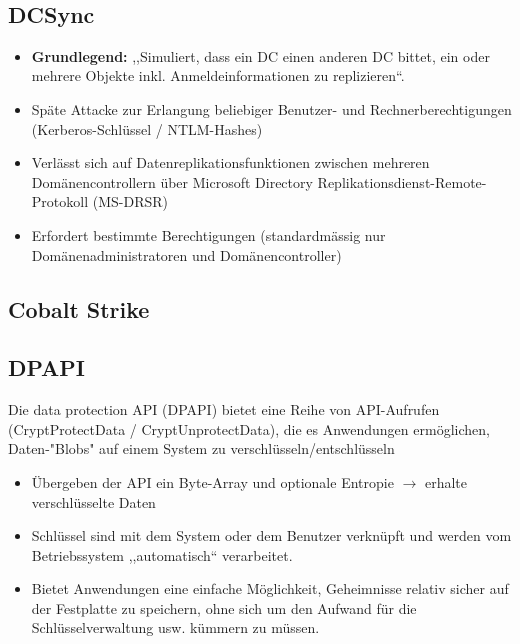 \vfill
$ $
\columnbreak

\subsection{DCSync}
\begin{itemize}
    \item \textbf{Grundlegend:} ,,Simuliert, dass ein DC einen anderen DC bittet, ein oder mehrere Objekte inkl. Anmeldeinformationen zu replizieren``.
    \item Späte Attacke zur Erlangung beliebiger Benutzer- und Rechnerberechtigungen (Kerberos-Schlüssel / NTLM-Hashes)
    \item Verlässt sich auf Datenreplikationsfunktionen zwischen mehreren Domänencontrollern über Microsoft Directory Replikationsdienst-Remote-Protokoll (MS-DRSR)
    \item Erfordert bestimmte Berechtigungen (standardmässig nur Domänenadministratoren und Domänencontroller)
\end{itemize}

\subsection{Cobalt Strike}

\subsection{DPAPI}

Die data protection API (DPAPI) bietet eine Reihe von API-Aufrufen (CryptProtectData / CryptUnprotectData), die es Anwendungen ermöglichen, Daten-"Blobs" auf einem System zu verschlüsseln/entschlüsseln
\begin{itemize}
    \item Übergeben der API ein Byte-Array und optionale Entropie $\rightarrow$  erhalte verschlüsselte Daten
    \item Schlüssel sind mit dem System oder dem Benutzer verknüpft und werden vom Betriebssystem ,,automatisch`` verarbeitet.
    \item Bietet Anwendungen eine einfache Möglichkeit, Geheimnisse relativ sicher auf der Festplatte zu speichern, ohne sich um den Aufwand für die Schlüsselverwaltung usw. kümmern zu müssen.
\end{itemize}

